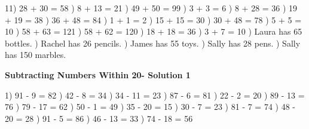 \documentclass{article}%
\begin{document}
11) 28 + 30 = 58%
) 8 + 13 = 21%
) 49 + 50 = 99%
) 3 + 3 = 6%
) 8 + 28 = 36%
) 19 + 19 = 38%
) 36 + 48 = 84%
) 1 + 1 = 2%
) 15 + 15 = 30%
) 30 + 48 = 78%
) 5 + 5 = 10%
) 58 + 63 = 121%
) 58 + 62 = 120%
) 18 + 18 = 36%
) 3 + 7 = 10%
) Laura has 65 bottles.%
) Rachel has 26 pencils.%
) James has 55 toys.%
) Sally has 28 pens.%
) Sally has 150 marbles.%
\newline%
\newpage%
\large%
\begin{center}%
\textbf{Subtracting Numbers Within 20- Solution 1}%
\newline%
\end{center} \normalsize%
1) 91 {-} 9 = 82%
) 42 {-} 8 = 34%
) 34 {-} 11 = 23%
) 87 {-} 6 = 81%
) 22 {-} 2 = 20%
) 89 {-} 13 = 76%
) 79 {-} 17 = 62%
) 50 {-} 1 = 49%
) 35 {-} 20 = 15%
) 30 {-} 7 = 23%
) 81 {-} 7 = 74%
) 48 {-} 20 = 28%
) 91 {-} 5 = 86%
) 46 {-} 13 = 33%
) 74 {-} 18 = 56%
\end{document}
